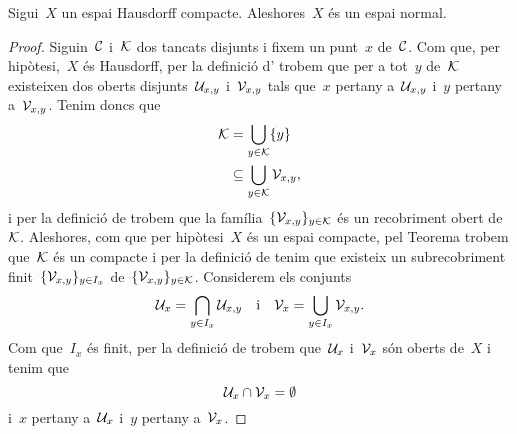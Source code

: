 \documentclass[../../main.tex]{subfiles}
\begin{document}
    \begin{theorem}
        \label{thm:els espais Hausdorff compactes són espais normals}
        Sigui~\(X\) un espai Hausdorff compacte.
        Aleshores~\(X\) és un espai normal.
        \begin{proof} %
            Siguin~\(\mathcal{C}\) i~\(\mathcal{K}\) dos tancats disjunts i fixem un punt~\(x\) de~\(\mathcal{C}\).
            Com que, per hipòtesi,~\(X\) és Hausdorff, per la definició d' trobem que per a tot~\(y\) de~\(\mathcal{K}\) existeixen dos oberts disjunts~\(\mathcal{U}_{x,y}\) i~\(\mathcal{V}_{x,y}\) tals que~\(x\) pertany a~\(\mathcal{U}_{x,y}\) i~\(y\) pertany a~\(\mathcal{V}_{x,y}\).
            Tenim doncs que
            \begin{align*}
                \mathcal{K}&=\bigcup_{y\in\mathcal{K}}\{y\} \\
                &\subseteq\bigcup_{y\in\mathcal{K}}\mathcal{V}_{x,y},
            \end{align*}
            i per la definició de  trobem que la família~\(\{\mathcal{V}_{x,y}\}_{y\in\mathcal{K}}\) és un recobriment obert de~\(\mathcal{K}\).
            Aleshores, com que per hipòtesi~\(X\) és un espai compacte, pel Teorema  trobem que~\(\mathcal{K}\) és un compacte i per la definició de  tenim que existeix un subrecobriment finit~\(\{\mathcal{V}_{x,y}\}_{y\in I_{x}}\) de~\(\{\mathcal{V}_{x,y}\}_{y\in\mathcal{K}}\).
            Considerem els conjunts
            \[
                \mathcal{U}_{x}=\bigcap_{y\in I_{x}}\mathcal{U}_{x,y}\quad\text{i}\quad\mathcal{V}_{x}=\bigcup_{y\in I_{x}}\mathcal{V}_{x,y}.
            \]
            Com que~\(I_{x}\) és finit, per la definició de  trobem que~\(\mathcal{U}_{x}\) i~\(\mathcal{V}_{x}\) són oberts de~\(X\) i tenim que
            \[
                \mathcal{U}_{x}\cap\mathcal{V}_{x}=\emptyset
            \]
            i~\(x\) pertany a~\(\mathcal{U}_{x}\) i~\(y\) pertany a~\(\mathcal{V}_{x}\).


\end{proof}
\end{theorem}
\end{document}
